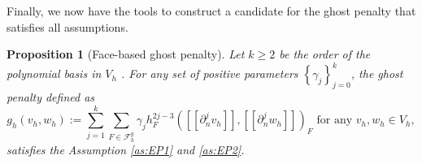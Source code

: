 \documentclass[11pt]{article}
\newtheorem{proposition}[theorem]{Proposition}
\theoremstyle{remark}
\newcommand{\jump}[1]{\left[\!\left[ #1 \right]\!\right]}
\renewcommand{\ge}{\geqslant}
\numberwithin{equation}{section}
\begin{document}
Finally, we now have the tools to construct a candidate for the ghost penalty that satisfies all assumptions.

\begin{proposition}[Face-based ghost penalty]
    Let $k\ge  2$ be the order of the polynomial basis in $V_{h}$ .
    For any set of positive parameters $\left\{ \gamma _{j} \right\} _{j=0}^{k}$, the ghost penalty defined as
    \begin{equation}
        \label{eq:ghost_penalty}
    g^{}_{h}( v_{h},w_{h})  := \sum_{j=1}^{k} \sum_{F \in \mathcal{F} _{h}^{g}}^{} \gamma _{j} h^{2j-3}_{F} ( \jump{ \partial ^{j}_{n} v_{h} }, \jump{ \partial ^{j}_{n} w_{h} }  ) _{F} \text{ for any } v_{h},w_{h} \in V_{h},
    \end{equation}
    satisfies the Assumption \ref{as:EP1} and \ref{as:EP2}.
\end{proposition}
\end{document}
